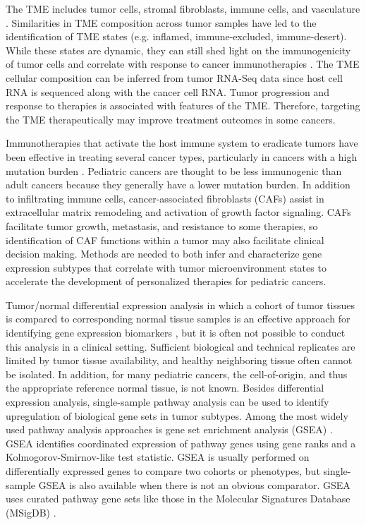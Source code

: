 \documentclass[10pt,letterpaper]{article}
\begin{document}
The TME includes tumor cells, stromal fibroblasts, immune cells, and vasculature \cite{joyceCellExclusionImmune2015}. Similarities in TME composition across tumor samples have led to the identification of TME states (e.g. inflamed, immune-excluded, immune-desert). While these states are dynamic, they can still shed light on the immunogenicity of tumor cells and correlate with response to cancer immunotherapies \cite{chenElementsCancerImmunity2017}. The TME cellular composition can be inferred from tumor RNA-Seq data since host cell RNA is sequenced along with the cancer cell RNA. Tumor progression and response to therapies is associated with features of the TME. Therefore, targeting the TME therapeutically may improve treatment outcomes in some cancers. 

Immunotherapies that activate the host immune system to eradicate tumors have been effective in treating several cancer types, particularly in cancers with a high mutation burden \cite{mellmanCancerImmunotherapyComes2011, pageImmuneModulationCancer2014}. Pediatric cancers are thought to be less immunogenic than adult cancers because they generally have a lower mutation burden. In addition to infiltrating immune cells, cancer-associated fibroblasts (CAFs) assist in extracellular matrix remodeling and activation of growth factor signaling. CAFs facilitate tumor growth, metastasis, and resistance to some therapies, so identification of CAF functions within a tumor may also facilitate clinical decision making. Methods are needed to both infer and characterize gene expression subtypes that correlate with tumor microenvironment states to accelerate the development of personalized therapies for pediatric cancers. 

Tumor/normal differential expression analysis in which a cohort of tumor tissues is compared to corresponding normal tissue samples is an effective approach for identifying gene expression biomarkers \cite{andersCountbasedDifferentialExpression2013, andersDifferentialExpressionAnalysis2010, sonesonComparisonMethodsDifferential2013}, but it is often not possible to conduct this analysis in a clinical setting. Sufficient biological and technical replicates are limited by tumor tissue availability, and healthy neighboring tissue often cannot be isolated. In addition, for many pediatric cancers, the cell-of-origin, and thus the appropriate reference normal tissue, is not known. Besides differential expression analysis, single-sample pathway analysis can be used to identify upregulation of biological gene sets in tumor subtypes. Among the most widely used pathway analysis approaches is gene set enrichment analysis (GSEA) \cite{subramanianGeneSetEnrichment2005, moothaPGC1alpharesponsiveGenesInvolved2003}. GSEA identifies coordinated expression of pathway genes using gene ranks and a Kolmogorov-Smirnov-like test statistic. GSEA is usually performed on differentially expressed genes to compare two cohorts or phenotypes, but single-sample GSEA is also available when there is not an obvious comparator. GSEA uses curated pathway gene sets like those in the Molecular Signatures Database (MSigDB) \cite{liberzonMolecularSignaturesDatabase2011}.
\end{document}
